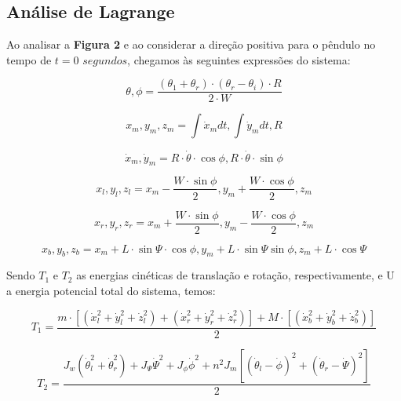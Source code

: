 \documentclass[12pt]{article}
\begin{document}
\subsection{Análise de Lagrange}

\quad Ao analisar a \textbf{Figura 2} e ao considerar a direção positiva para o pêndulo no tempo de $t = 0$ $segundos$, chegamos às seguintes expressões do sistema: 

\begin{equation}
    \theta,\phi = \frac{(\theta_1 + \theta_r)\cdot (\theta_r - \theta_i) \cdot R}{2 \cdot W} 
\end{equation}

\begin{equation}
    x_m, y_m,z_m = \int{ \Dot{x}_m dt}, \int {\Dot{y}_m dt}, R
\end{equation}

\begin{equation}
    \Dot{x}_m,\Dot{y}_m = R \cdot \Dot{\theta} \cdot  \cos{\phi}, R \cdot  \Dot{\theta} \cdot \sin{\phi}
\end{equation}

\begin{equation}
    x_l,y_l,z_l = x_m - \frac{W \cdot \sin{\phi}}{2}, y_m + \frac{W \cdot \cos{\phi}}{2} , z_m
\end{equation}

\begin{equation}
    x_r,y_r,z_r = x_m + \frac{W \cdot \sin{\phi}}{2}, y_m - \frac{W \cdot \cos{\phi}}{2}, z_m
\end{equation}

\begin{equation}
    x_b, y_b, z_b = x_m + L \cdot \sin{\Psi} \cdot \cos{\phi},y_m + L \cdot \sin{\Psi} \sin{\phi}, z_m + L \cdot \cos{\Psi}
\end{equation}

\quad Sendo $T_1$  e $T_2$ as energias cinéticas de translação e rotação, respectivamente, e U a energia potencial total do sistema, temos:

\begin{equation}
    T_1 = \frac{m \cdot [(\dot{x}_l^2 + \dot{y}_l^2 + \dot{z}_l^2) + ( \dot{x}_r^2 + \dot{y}_r^2 + \dot{z}_r^2)] + M \cdot [(\dot{x}_b^2 + \dot{y}_b^2 + \dot{z}_b^2)]}{2}
\end{equation}

\begin{equation}
    T_2 = \frac{J_w(\Dot{\theta}_l^2 +\Dot{\theta}_r^2) +J_{\Psi} \dot{{\Psi}}^2 + J_{\phi}\dot{{\phi}}^2+ n^2 J_m[(\dot{\theta}_l - \dot{\phi})^2 + (\dot{\theta}_r - \dot{\Psi})^2]}{2}
\end{equation}
\end{document}
